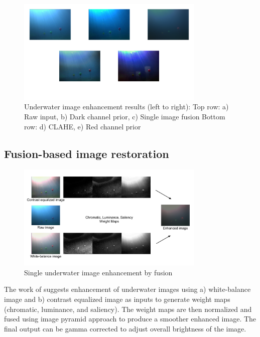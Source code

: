 \documentclass[fypca]{socreport}
\begin{document}
\begin{figure}[H]
\centering
  \includegraphics[width=0.8\textwidth, height=0.3\textheight]{enhancement_results.png}
  \caption{Underwater image enhancement results (left to right): \newline Top row:
  a) Raw input, b) Dark channel prior, c) Single image fusion \newline Bottom
  row: d) CLAHE, e) Red channel prior}
  \label{fig:underwater_image_enhancement_results}
\end{figure}

\subsection{Fusion-based image restoration}

\begin{figure}[H]
\centering
  \includegraphics[width=0.8\textwidth, height=0.3\textheight]{fusion_pipeline.png}
  \caption{Single underwater image enhancement by fusion}
  \label{fig:fusion_pipeline}
\end{figure}

The work of  suggests enhancement of underwater
images using a) white-balance image and b) contrast equalized image as inputs to
generate weight maps (chromatic, luminance, and saliency). The weight maps are
then normalized and fused using image pyramid approach to produce a smoother
enhanced image. The final output can be gamma corrected to adjust overall
brightness of the image.
\end{document}
